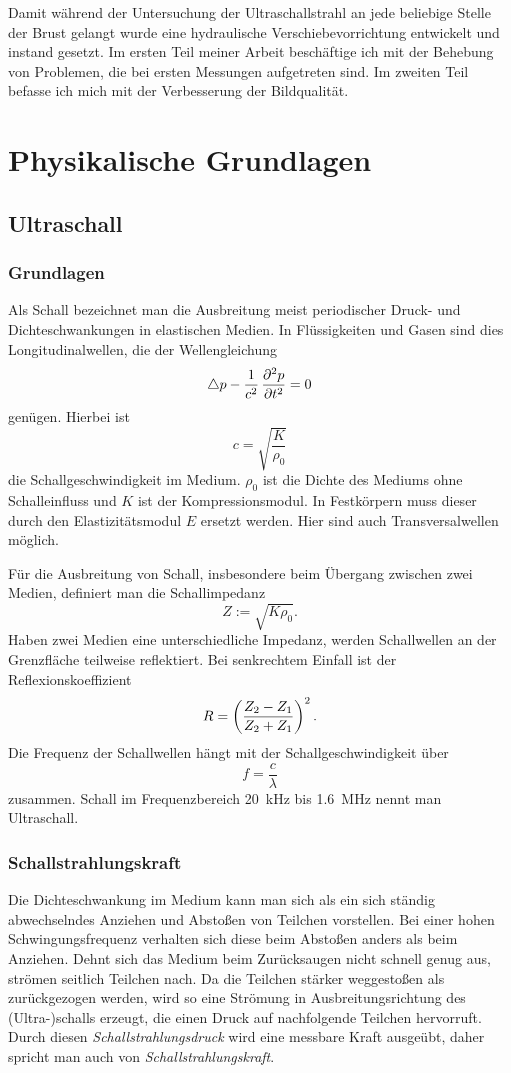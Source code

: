 \documentclass[
    11pt,
    ngerman
]{scrbook}
\begin{document}
Damit während der Untersuchung der Ultraschallstrahl an jede beliebige Stelle
der Brust gelangt wurde eine hydraulische Verschiebevorrichtung entwickelt und
instand gesetzt. Im ersten Teil meiner Arbeit beschäftige ich mit der Behebung
von Problemen, die bei ersten Messungen aufgetreten sind. Im zweiten Teil
befasse ich mich mit der Verbesserung der Bildqualität.

\chapter{Physikalische Grundlagen}

\section{Ultraschall}

\subsection{Grundlagen}

Als Schall bezeichnet man die Ausbreitung meist periodischer Druck- und
Dichteschwankungen in elastischen Medien. In Flüssigkeiten und Gasen sind dies
Longitudinalwellen, die der Wellengleichung
\[
    \laplace p - \frac1{c^2}\dpd[2]pt = 0
\]
genügen. Hierbei ist
\[
    c=\sqrt{\frac{K}{\rho_0}}
\]
die Schallgeschwindigkeit im Medium. $\rho_0$ ist die Dichte des Mediums ohne
Schalleinfluss und $K$ ist der Kompressionsmodul. In Festkörpern muss dieser
durch den Elastizitätsmodul $E$ ersetzt werden. Hier sind auch
Transversalwellen möglich.

Für die Ausbreitung von Schall, insbesondere beim Übergang zwischen zwei
Medien, definiert man die Schallimpedanz
\[
    Z:=\sqrt{K\rho_0}.
\]
Haben zwei Medien eine unterschiedliche Impedanz, werden Schallwellen an der
Grenzfläche teilweise reflektiert. Bei senkrechtem Einfall ist der
Reflexionskoeffizient
\[
    R=\del{\frac{Z_2-Z_1}{Z_2+Z_1}}^2.
\]
Die Frequenz der Schallwellen hängt mit der Schallgeschwindigkeit über
\[
    f = \frac c\lambda
\]
zusammen. Schall im Frequenzbereich \SI{20}{\kilo\hertz} bis
\SI{1.6}{\mega\hertz} nennt man Ultraschall.

\subsection{Schallstrahlungskraft}

Die Dichteschwankung im Medium kann man sich als ein sich ständig
abwechselndes Anziehen und Abstoßen von Teilchen vorstellen. Bei einer hohen
Schwingungsfrequenz verhalten sich diese beim Abstoßen anders als beim
Anziehen. Dehnt sich das Medium beim Zurücksaugen nicht schnell genug aus,
strömen seitlich Teilchen nach. Da die Teilchen stärker weggestoßen als
zurückgezogen werden, wird so eine Strömung in Ausbreitungsrichtung des
(Ultra-)schalls erzeugt, die einen Druck auf nachfolgende Teilchen hervorruft.
Durch diesen \emph{Schallstrahlungsdruck} wird eine messbare Kraft ausgeübt,
daher spricht man auch von \emph{Schallstrahlungskraft}. 
\end{document}
